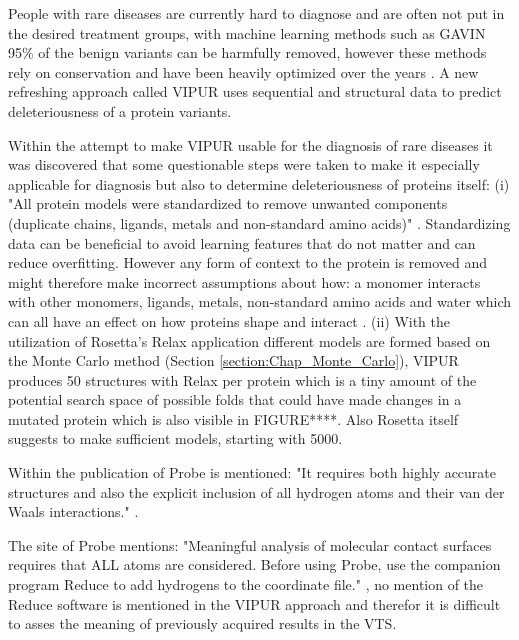 People with rare diseases are currently hard to diagnose and are often not put in the desired treatment groups, with machine learning methods such as GAVIN 95\% of the benign variants can be harmfully removed, however these methods rely on conservation and have been heavily optimized over the years \cite{}.
A new refreshing approach called VIPUR uses sequential and structural data to predict deleteriousness of a protein variants.

Within the attempt to make VIPUR usable for the diagnosis of rare diseases it was discovered that some questionable steps were taken to make it especially applicable for diagnosis but also to determine deleteriousness of proteins itself: (i) "All protein models were standardized to remove unwanted components (duplicate chains, ligands, metals and non-standard amino acids)" \cite{}.
Standardizing data can be beneficial to avoid learning features that do not matter and can reduce overfitting. However any form of context to the protein is removed and might therefore make incorrect assumptions about how: a monomer interacts with other monomers, ligands, metals, non-standard amino acids and water which can all have an effect on how proteins shape and interact \cite{}.
(ii) With the utilization of Rosetta's Relax application different models are formed based on the Monte Carlo method (Section \ref{section:Chap_Monte_Carlo}), VIPUR produces 50 structures with Relax per protein which is a tiny amount of the potential search space of possible folds that could have made changes in a mutated protein which is also visible in FIGURE****. Also Rosetta itself suggests to make sufficient models, starting with 5000\cite{}.

Within the publication of Probe is mentioned: "It requires both highly accurate structures and also the explicit inclusion of all hydrogen atoms and their van der Waals interactions." \cite{}.

The site of Probe mentions: "Meaningful analysis of molecular contact surfaces requires that ALL atoms are considered. Before using Probe, use the companion program Reduce to add hydrogens to the coordinate file." \cite{}, no mention of the Reduce software is mentioned in the VIPUR approach and therefor it is difficult to asses the meaning of previously acquired results in the VTS.


